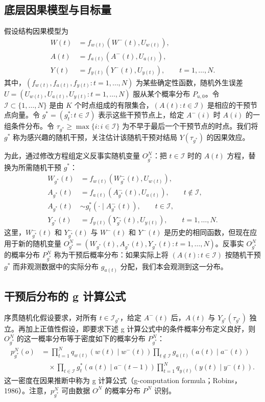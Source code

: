 \subsection{底层因果模型与目标量}

假设结构因果模型为
\[
\begin{aligned}
 W(t)&=f_{w(t)}(W^-(t),U_{w(t)}),\\
 A(t)&=f_{a(t)}(A^-(t),U_{a(t)}),\\
 Y(t)&=f_{y(t)}(Y^-(t),U_{y(t)}),\qquad t=1,\ldots,N.
\end{aligned}
\]
其中，$(f_{w(t)},f_{a(t)},f_{y(t)}:t=1,\ldots,N)$ 为某些确定性函数，随机外生误差 $U=(U_{w(t)},U_{a(t)},U_{y(t)}:t=1,\ldots,N)$ 服从某个概率分布 $P_{u,0}$。令 $\mathcal I\subset\{1,\ldots,N\}$ 是由 $K$ 个时点组成的有限集合，$(A(t):t\in\mathcal I)$ 是相应的干预节点向量。令 $g^*=(g_t^*:t\in\mathcal I)$ 表示这些干预节点上，给定 $A^-(i)$ 时 $A(i)$ 的一组条件分布。令 $\tau_{g^*}\geq\max\{i:i\in\mathcal I\}$ 为不早于最后一个干预节点的时点。我们将 $g^*$ 称为感兴趣的随机干预，关注估计该随机干预对结局 $Y(\tau_{g^*})$ 的因果效应。

为此，通过修改方程组定义反事实随机变量 $O_{g^*}^N$：把 $t\in\mathcal I$ 时的 $A(t)$ 方程，替换为所需随机干预 $g^*$：
\[
\begin{aligned}
 W_{g^*}(t)&=f_{w(t)}(W^-_{g^*}(t),U_{w(t)}),\\
 A_{g^*}(t)&=f_{a(t)}(A^-_{g^*}(t),U_{a(t)}),\qquad t\notin\mathcal I,\\
 A_{g^*}(t)&\sim g_t^*(\cdot\mid A^-_{g^*}(t)),\qquad t\in\mathcal I,\\
 Y_{g^*}(t)&=f_{y(t)}(Y^-_{g^*}(t),U_{y(t)}),\qquad t=1,\ldots,N.
\end{aligned}
\]
这里，$W^-_{g^*}(t)$ 和 $Y^-_{g^*}(t)$ 与 $W^-(t)$ 和 $Y^-(t)$ 是历史的相同函数，但现在应用于新的随机变量 $O_{g^*}^N=(W_{g^*}(t),A_{g^*}(t),Y_{g^*}(t):t=1,\ldots,N)$。反事实 $O_{g^*}^N$ 的概率分布 $P_{g^*}^N$ 称为干预后概率分布：如果实际上将 $(A(t):t\in\mathcal I)$ 按随机干预 $g^*$ 而非观测数据中的实际分布 $g_{a(t)}$ 分配，我们本会观测到这一分布。

\subsection{干预后分布的 g 计算公式}

序贯随机化假设要求，对所有 $t\in\mathcal I_{g^*}$，给定 $A^-(t)$ 后，$A(t)$ 与 $Y_{g^*}(\tau_{g^*})$ 独立。再加上正值性假设，即要求下述 g 计算公式中的条件概率分布定义良好，则 $O_{g^*}^N$ 的这一概率分布等于密度如下的概率分布 $P_{g^*}^N$：
\[
\begin{aligned}
 p_{g^*}^N(o)
 &=\prod_{t=1}^N q_{w(t)}(w(t)\mid w^-(t))
 \prod_{t\notin\mathcal I}g_{a(t)}(a(t)\mid a^-(t))\\
 &\quad\times\prod_{t\in\mathcal I}g_t^*(a(t)\mid a^-(t-1))
 \prod_{t=1}^N q_{y(t)}(y(t)\mid y^-(t)).
\end{aligned}
\]
这一密度在因果推断中称为 g 计算公式（g-computation formula；Robins，1986）。注意，$p_{g^*}^N$ 可由数据 $O^N$ 的概率分布 $P^N$ 识别。


